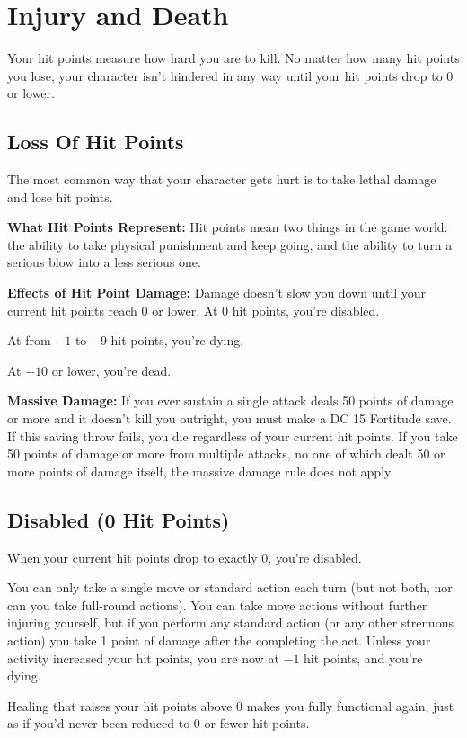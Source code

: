 \section{Injury and Death}
Your hit points measure how hard you are to kill. No matter how many hit points you lose, your character isn't hindered in any way until your hit points drop to 0 or lower.

\subsection{Loss Of Hit Points}
The most common way that your character gets hurt is to take lethal damage and lose hit points.

\textbf{What Hit Points Represent:} Hit points mean two things in the game world: the ability to take physical punishment and keep going, and the ability to turn a serious blow into a less serious one.

\textbf{Effects of Hit Point Damage:} Damage doesn't slow you down until your current hit points reach 0 or lower. At 0 hit points, you're disabled.

At from $-1$ to $-9$ hit points, you're dying.

At $-10$ or lower, you're dead.

\textbf{Massive Damage:} If you ever sustain a single attack deals 50 points of damage or more and it doesn't kill you outright, you must make a DC 15 Fortitude save. If this saving throw fails, you die regardless of your current hit points. If you take 50 points of damage or more from multiple attacks, no one of which dealt 50 or more points of damage itself, the massive damage rule does not apply.

\subsection{Disabled (0 Hit Points)}
When your current hit points drop to exactly 0, you're disabled.

You can only take a single move or standard action each turn (but not both, nor can you take full-round actions). You can take move actions without further injuring yourself, but if you perform any standard action (or any other strenuous action) you take 1 point of damage after the completing the act. Unless your activity increased your hit points, you are now at $-1$ hit points, and you're dying.

Healing that raises your hit points above 0 makes you fully functional again, just as if you'd never been reduced to 0 or fewer hit points.

